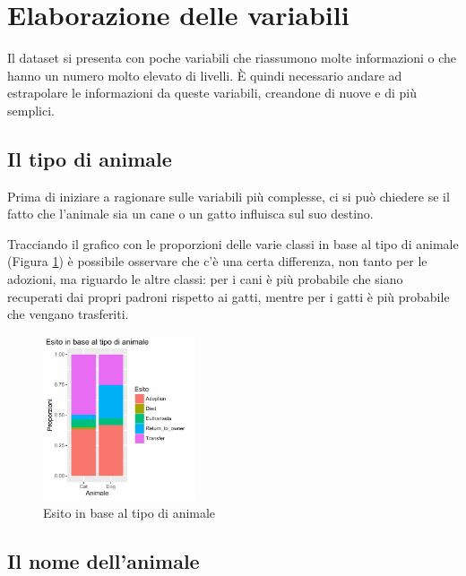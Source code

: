 
\section{Elaborazione delle variabili}

Il dataset si presenta con poche variabili che riassumono molte informazioni o che hanno un numero molto elevato di livelli. \`E quindi necessario andare ad estrapolare le informazioni da queste variabili, creandone di nuove e di più semplici.

\subsection{Il tipo di animale}

Prima di iniziare a ragionare sulle variabili più complesse, ci si può chiedere se il fatto che l'animale sia un cane o un gatto influisca sul suo destino.

Tracciando il grafico con le proporzioni delle varie classi in base al tipo di animale (Figura \ref{fig-animals}) è possibile osservare che c'è una certa differenza, non tanto per le adozioni, ma riguardo le altre classi: per i cani è più probabile che siano recuperati dai propri padroni rispetto ai gatti, mentre per i gatti è più probabile che vengano trasferiti.

\begin{figure}[htbp]
	\centering
	\includegraphics[width=0.4\textwidth]{./grafici/esito_animal.pdf}
	\caption{Esito in base al tipo di animale}\label{fig-animals}
	\end{figure}

\subsection{Il nome dell'animale}

